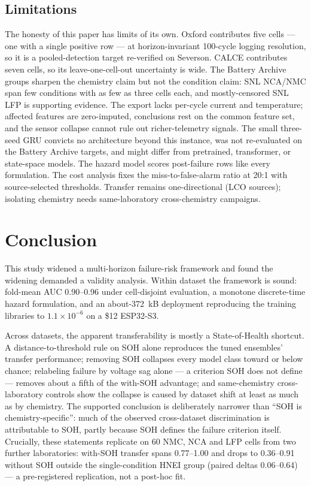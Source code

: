 \subsection{Limitations}
The honesty of this paper has limits of its own. Oxford contributes five cells --- one with a single positive row --- at horizon-invariant 100-cycle logging resolution, so it is a pooled-detection target re-verified on Severson. CALCE contributes seven cells, so its leave-one-cell-out uncertainty is wide. The Battery Archive groups sharpen the chemistry claim but not the condition claim: SNL NCA/NMC span few conditions with as few as three cells each, and mostly-censored SNL LFP is supporting evidence. The export lacks per-cycle current and temperature; affected features are zero-imputed, conclusions rest on the common feature set, and the sensor collapse cannot rule out richer-telemetry signals. The small three-seed GRU convicts no architecture beyond this instance, was not re-evaluated on the Battery Archive targets, and might differ from pretrained, transformer, or state-space models. The hazard model scores post-failure rows like every formulation. The cost analysis fixes the miss-to-false-alarm ratio at 20:1 with source-selected thresholds. Transfer remains one-directional (LCO sources); isolating chemistry needs same-laboratory cross-chemistry campaigns.

\section{Conclusion}
This study widened a multi-horizon failure-risk framework and found the widening demanded a validity analysis. Within dataset the framework is sound: fold-mean AUC 0.90--0.96 under cell-disjoint evaluation, a monotone discrete-time hazard formulation, and an about-372~kB deployment reproducing the training libraries to $1.1\times10^{-6}$ on a \$12 ESP32-S3.

Across datasets, the apparent transferability is mostly a State-of-Health shortcut. A distance-to-threshold rule on SOH alone reproduces the tuned ensembles' transfer performance; removing SOH collapses every model class toward or below chance; relabeling failure by voltage sag alone --- a criterion SOH does not define --- removes about a fifth of the with-SOH advantage; and same-chemistry cross-laboratory controls show the collapse is caused by dataset shift at least as much as by chemistry. The supported conclusion is deliberately narrower than ``SOH is chemistry-specific'': much of the observed cross-dataset discrimination is attributable to SOH, partly because SOH defines the failure criterion itself. Crucially, these statements replicate on 60 NMC, NCA and LFP cells from two further laboratories: with-SOH transfer spans 0.77--1.00 and drops to 0.36--0.91 without SOH outside the single-condition HNEI group (paired deltas 0.06--0.64) --- a pre-registered replication, not a post-hoc fit.

